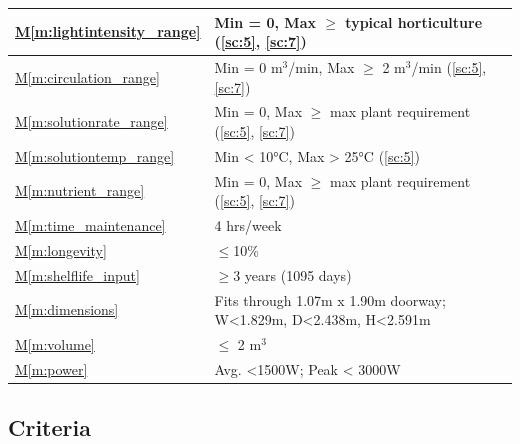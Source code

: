 \documentclass{report}
\newcommand{\mref}[1]{\hyperref[#1]{M\ref{#1}}}
\begin{document}
\begin{tabular}{|l|p{14.35cm}|}
    \mref{m:lightintensity_range} & Min = 0, Max $\ge$ typical horticulture \hfill (\ref{sc:5}, \ref{sc:7}) \\
    \hline
    \mref{m:circulation_range} & Min = 0 m${}^3$/min, Max $\ge$ 2 m${}^3$/min \hfill (\ref{sc:5}, \ref{sc:7}) \\
    \hline
    \mref{m:solutionrate_range} & Min = 0, Max $\ge$ max plant requirement \hfill (\ref{sc:5}, \ref{sc:7}) \\
    \hline
    \mref{m:solutiontemp_range} & Min < 10°C, Max > 25°C \hfill (\ref{sc:5})\\
    \hline
    \mref{m:nutrient_range} & Min = 0, Max $\ge$ max plant requirement \hfill (\ref{sc:5}, \ref{sc:7}) \\
    \hline
    \mref{m:time_maintenance} & 4 hrs/week \hfill \cite{applicantguide}\\
    \hline
    \mref{m:longevity} & $\le$10\% \hfill \cite{applicantguide}\\
    \hline
    \mref{m:shelflife_input} & $\ge$3 years (1095 days) \hfill \cite{applicantguide}\\
    \hline
    \mref{m:dimensions} & Fits through 1.07m x 1.90m doorway; W<1.829m, D<2.438m, H<2.591m \hfill \cite{applicantguide} \\
    \hline
    \mref{m:volume} & $\le$ 2 m${}^3$ \hfill \cite{applicantguide}\\
    \hline
    \mref{m:power} & Avg. <1500W; Peak < 3000W \hfill \cite{applicantguide}\\
    \hline
\end{tabular}

\subsection{Criteria}
\label{sec:criteria}
\end{document}
